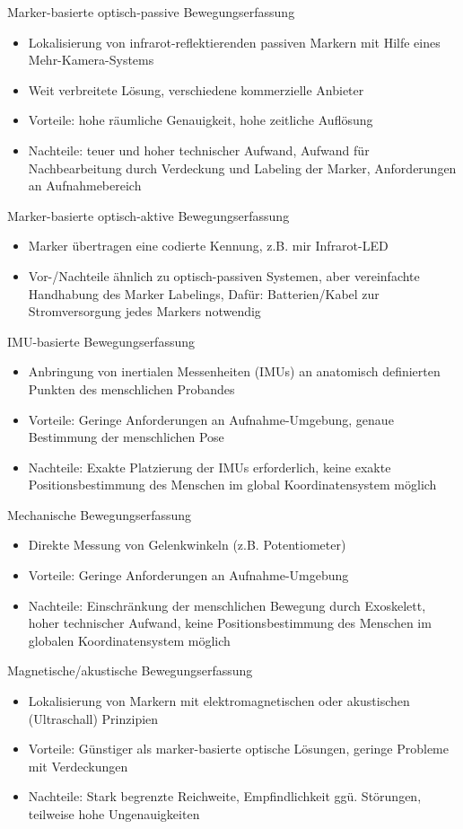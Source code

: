 \documentclass[paper=a4, fontsize=11pt]{scrartcl} %
\numberwithin{equation}{section} %
\numberwithin{figure}{section} %
\numberwithin{table}{section} %
\begin{document}
Marker-basierte optisch-passive Bewegungserfassung
\begin{itemize}
\item Lokalisierung von infrarot-reflektierenden passiven Markern mit Hilfe eines Mehr-Kamera-Systems
\item Weit verbreitete Lösung, verschiedene kommerzielle Anbieter
\item Vorteile: hohe räumliche Genauigkeit, hohe zeitliche Auflösung
\item Nachteile: teuer und hoher technischer Aufwand, Aufwand für Nachbearbeitung durch Verdeckung und Labeling der Marker, Anforderungen an Aufnahmebereich
\end{itemize}

Marker-basierte optisch-aktive Bewegungserfassung
\begin{itemize}
\item Marker übertragen eine codierte Kennung, z.B. mir Infrarot-LED
\item Vor-/Nachteile ähnlich zu optisch-passiven Systemen, aber vereinfachte Handhabung des Marker Labelings, Dafür: Batterien/Kabel zur Stromversorgung jedes Markers notwendig
\end{itemize}

IMU-basierte Bewegungserfassung
\begin{itemize}
\item Anbringung von inertialen Messenheiten (IMUs) an anatomisch definierten Punkten des menschlichen Probandes
\item Vorteile: Geringe Anforderungen an Aufnahme-Umgebung, genaue Bestimmung der menschlichen Pose
\item Nachteile: Exakte Platzierung der IMUs erforderlich, keine exakte Positionsbestimmung des Menschen im global Koordinatensystem möglich
\end{itemize}

Mechanische Bewegungserfassung
\begin{itemize}
\item Direkte Messung von Gelenkwinkeln (z.B. Potentiometer)
\item Vorteile: Geringe Anforderungen an Aufnahme-Umgebung
\item Nachteile: Einschränkung der menschlichen Bewegung durch Exoskelett, hoher technischer Aufwand, keine Positionsbestimmung des Menschen im globalen Koordinatensystem möglich
\end{itemize}

Magnetische/akustische Bewegungserfassung
\begin{itemize}
\item Lokalisierung von Markern mit elektromagnetischen oder akustischen (Ultraschall) Prinzipien
\item Vorteile: Günstiger als marker-basierte optische Lösungen, geringe Probleme mit Verdeckungen
\item Nachteile: Stark begrenzte Reichweite, Empfindlichkeit ggü. Störungen, teilweise hohe Ungenauigkeiten
\end{itemize}
\end{document}
